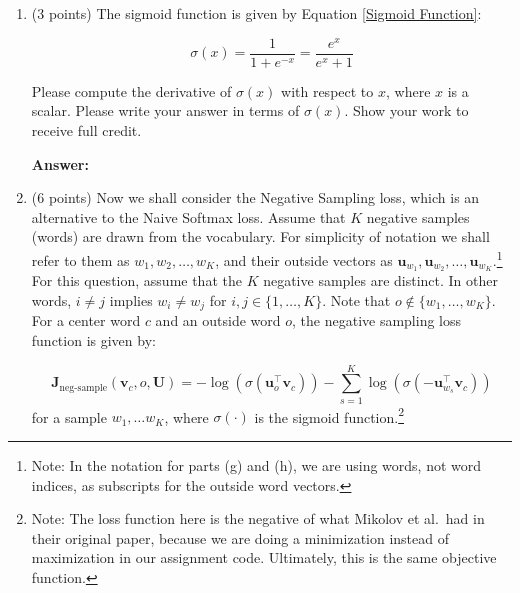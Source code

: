 \documentclass{article}
\newenvironment{answer}{
    {\bf Answer:} \sf \begingroup\color{red}
}{\endgroup}%
\begin{document}
\begin{enumerate}[label=(\alph*)]
\begin{shaded}
\begin{answer}
$\frac{\partial f(x)}{\partial x} = \begin{cases}
        1 & \text{if } x > 0\\
        0 & \text{if } x < 0
    \end{cases}$
\end{answer}
\end{shaded}

\item (3 points) The sigmoid function is given by Equation \ref{Sigmoid Function}:

\begin{equation}
    \label{Sigmoid Function}
    \sigma (x) = \frac{1}{1 + e^{-x}} = \frac{e^{x}}{e^{x} + 1}
\end{equation}

Please compute the derivative of $\sigma(x)$ with respect to $x$, where $x$ is a scalar. Please write your answer in terms of $\sigma(x)$. Show your work to receive full credit.

\begin{shaded}
\begin{answer}

\end{answer}
\end{shaded}

\item (6 points) Now we shall consider the Negative Sampling loss, which is an alternative to the Naive Softmax loss.  Assume that $K$ negative samples (words) are drawn from the vocabulary. For simplicity of notation we shall refer to them as $w_1, w_2, \dots, w_K$, and their outside vectors as $\bm u_{w_1}, \bm u_{w_2}, \dots, \bm u_{w_K}$.\footnote{Note: In the notation for parts (g) and (h), we are using words, not word indices, as subscripts for the outside word vectors.} For this question, assume that the $K$ negative samples are distinct. In other words, $i\neq j$ implies $w_i\neq w_j$ for $i,j\in\{1,\dots,K\}$.
Note that $o\notin\{w_1, \dots, w_K\}$. 
For a center word $c$ and an outside word $o$, the negative sampling loss function is given by:

\begin{equation}
\bm J_{\text{neg-sample}}(\bm v_c, o, \bm U) = -\log(\sigma(\bm u_o^\top \bm v_c)) - \sum_{s=1}^K \log(\sigma(-\bm u_{w_s}^\top \bm v_c))
\end{equation}
for a sample $w_1, \ldots w_K$, where $\sigma(\cdot)$ is the sigmoid function.\footnote{Note: The loss function here is the negative of what Mikolov et al.\ had in their original paper, because we are doing a minimization instead of maximization in our assignment code. Ultimately, this is the same objective function.}


\end{enumerate}
\end{document}
